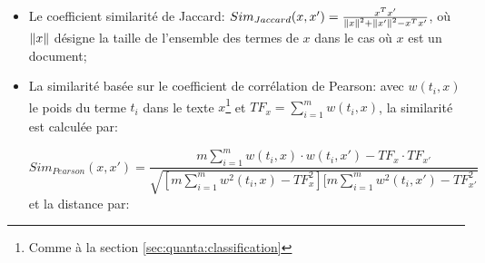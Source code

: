 \begin{itemize}
	\item Le coefficient similarité de Jaccard: $Sim_{Jaccard}(x,x') = \frac{x^Tx'}{\left\lVert x\right\rVert^2+\left\lVert x'\right\rVert^2 - x^Tx'}$, où $\left\lVert x\right\rVert$ désigne la taille de l'ensemble des termes de $x$ dans le cas où $x$ est un document;
	\item La similarité basée sur le coefficient de corrélation de Pearson: avec $w(t_i,x)$ le poids du terme $t_i$ dans le texte $x$\footnote{Comme à la section \ref{sec:quanta:classification}} et $TF_x = \sum\limits^m_{i=1} w(t_i,x)$, la similarité est calculée par:
	
	\[Sim_{Pearson}(x,x') = \frac{m \sum\limits^m_{i=1} w(t_i,x) \cdot w(t_i,x') - TF_x\cdot TF_{x'}}{\sqrt{[m \sum\limits^m_{i=1} w^2(t_i,x) - TF^2_x][m \sum\limits^m_{i=1} w^2(t_i,x') - TF^2_{x'}}}\]
et la distance par:


\end{itemize}
